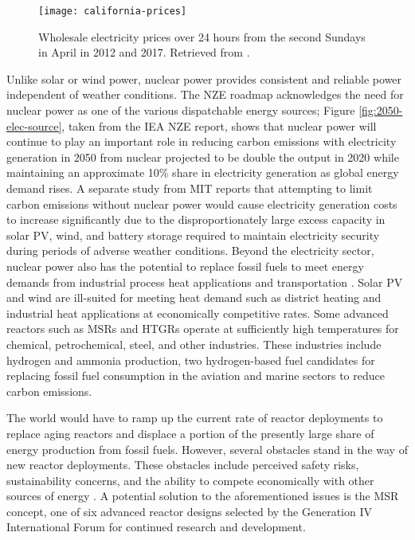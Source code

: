 \begin{figure}[htb!]
	\centering
	\texttt{[image: california-prices]}
	\caption{Wholesale electricity prices over 24 hours from the second Sundays
	in April in 2012 and 2017. Retrieved from \cite{forsberg_market_2020}.}
	\label{fig:cali-prices}
\end{figure}

Unlike solar or wind power, nuclear power provides consistent and reliable
power independent of weather conditions. The \gls{NZE} roadmap acknowledges the
need for nuclear power as one of the various dispatchable energy sources;
Figure \ref{fig:2050-elec-source}, taken from the \gls{IEA} \gls{NZE} report,
shows that nuclear power will continue to play an important role in reducing
carbon emissions with electricity generation in 2050 from nuclear projected to
be double the output in 2020 while maintaining an approximate 10\% share in
electricity generation as global energy demand rises. A separate study from
\gls{MIT} \cite{petti_future_2018} reports that attempting to limit carbon
emissions without nuclear power would cause electricity generation costs to
increase significantly due to the disproportionately large excess capacity in
solar \gls{PV}, wind, and battery storage required to maintain electricity
security during periods of adverse weather conditions.
Beyond the electricity sector, nuclear power also has the potential to replace
fossil fuels to meet energy demands from industrial process heat applications
and transportation \cite{forsberg_market_2020}. Solar \gls{PV} and
wind are ill-suited for meeting heat demand such as district heating and
industrial heat applications at economically competitive rates. Some advanced
reactors such as \glspl{MSR} and \glspl{HTGR} operate at sufficiently
high temperatures for chemical, petrochemical, steel, and other industries.
These industries include hydrogen and ammonia production, two hydrogen-based
fuel candidates for replacing fossil fuel consumption in the aviation and
marine sectors to reduce carbon emissions.

The world would have to ramp up the current rate of reactor deployments to
replace aging reactors and displace a portion of the presently large share of
energy production from fossil fuels. However, several obstacles stand in the
way of new reactor deployments. These obstacles include perceived
safety risks, sustainability concerns,
and the ability to compete economically with other sources of energy
\cite{massachusetts_institute_of_technology_future_2003}. A potential solution
to the aforementioned issues is the \gls{MSR} concept, one of six advanced
reactor designs selected by the Generation IV International Forum
\cite{gif_technology_2002} for continued research and development.

